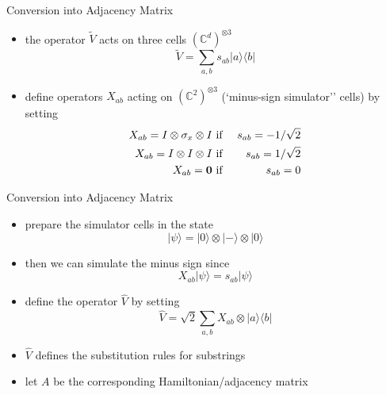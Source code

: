\documentclass[slideColor]{prosper}
\newcommand{\C}{{\mathbb{C}}}
\renewcommand{\>}{\rangle}
\newcommand{\<}{\langle}
\begin{document}

\begin{slide}{Conversion into Adjacency Matrix}
\begin{itemize}
\item the operator $\tilde{V}$ acts on three cells $(\C^d)^{\otimes 3}$
\[
\tilde{V}=\sum_{a,b} s_{ab}|a\>\<b|
\]
\item define operators $X_{ab}$ acting on $(\C^2)^{\otimes 3}$ (`minus-sign simulator'' cells) by setting
\begin{eqnarray*}
X_{ab} = I \otimes \sigma_x \otimes I &\mbox{ if }& s_{ab}=-1/\sqrt{2} \\
X_{ab} = I \otimes I        \otimes I &\mbox{ if }& s_{ab}=1/\sqrt{2}  \\
X_{ab} = {\bf 0}                      &\mbox{ if }& s_{ab}=0 
\end{eqnarray*}
\end{itemize}
\end{slide}


\begin{slide}{Conversion into Adjacency Matrix}
\begin{itemize}
\item prepare the simulator cells in the state
\[
|\psi\> = |0\> \otimes |-\> \otimes |0\> 
\]
\item then we can simulate the minus sign since
\[
X_{ab} |\psi\> = s_{ab} |\psi\>
\]
\item define the operator $\hat{V}$ by setting
\[
\hat{V}=\sqrt{2}\sum_{a,b} X_{ab} \otimes |a\>\<b|
\]
\item $\hat{V}$ defines the substitution rules for substrings
\item let $A$ be the corresponding Hamiltonian/adjacency matrix
\end{itemize}
\end{slide}

\end{document}
